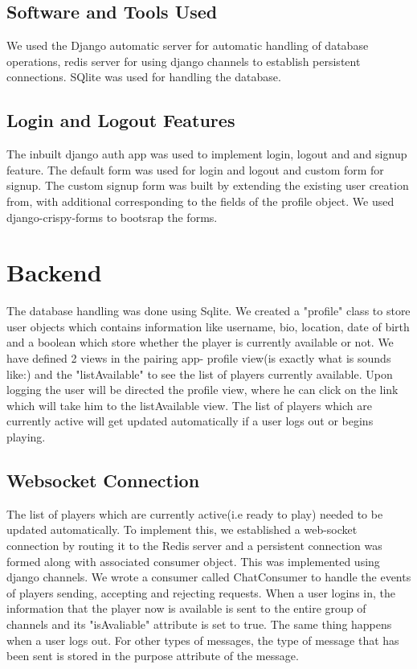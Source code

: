 \documentclass[titlepage]{article}
\begin{document}
\subsection{Software and Tools Used}
We used the Django automatic server for automatic handling of database operations, redis server for using django channels to establish persistent connections. SQlite was used for handling the database. 
\subsection{Login and Logout Features}
The inbuilt django auth app was used to implement login, logout and and signup feature. The default form was used for login and logout and custom form for signup. The custom signup form was built by extending the existing user creation from, with additional corresponding to the fields of the profile object. We used django-crispy-forms to bootsrap the forms. 
\section{Backend}
 The database handling was done using Sqlite. We created a "profile" class to store user objects which contains information like username, bio, location, date of birth and a boolean which store whether the player is currently available or not. We have defined 2 views in the pairing app- profile view(is exactly what is sounds like:) and the "listAvailable" to see the list of players currently available. Upon logging the user will be directed the profile view, where he can click on the link which will take him to the listAvailable view. The list of players which are currently active will get updated automatically if a user logs out or begins playing. 
\subsection{Websocket Connection}
The list of players which are currently active(i.e ready to play) needed to be updated automatically. To implement this, we established a web-socket connection by routing it to the Redis server and a persistent connection was formed along with associated consumer object. This was implemented using django channels. We wrote a consumer called ChatConsumer to handle the events of players sending, accepting and rejecting requests. When a user logins in, the information that the player now is available is sent to the entire group of channels and its "isAvaliable" attribute is set to true. The same thing happens when a user logs out. For other types of messages, the type of message that has been sent is stored in the purpose attribute of the message. 
\end{document}
